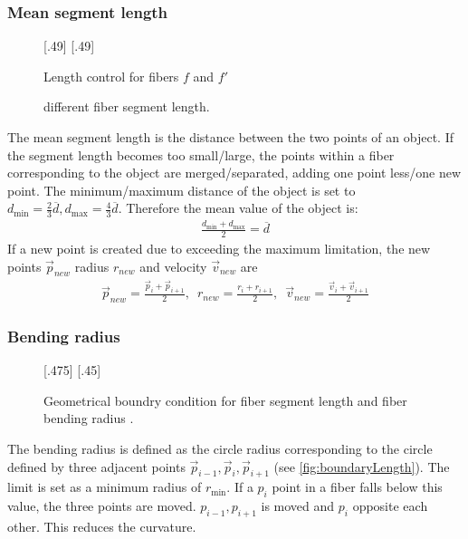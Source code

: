 \subsubsection{Mean segment length}
% 
\begin{figure}[!t]
    \centering
    \setlength{\tikzwidth}{.45\textwidth}
    [.49\textwidth]{
    }
    [.49\textwidth]{
    }
	\caption{Length control for fibers $f$ and $f'$}
	\label{fig:mergeSplit}
\end{figure}
% 
% 
\begin{figure}[!t]
    \centering
    \setlength{\tikzwidth}{0.75\textwidth}
    \tikzset{external/export next=false}
	\caption{different fiber segment length.}
	\label{fig:modelLength}
\end{figure}
% 
The mean segment length is the distance between the two points of an object.
If the segment length becomes too small/large, the points within a fiber corresponding to the object are merged/separated, adding one point less/one new point.
The minimum/maximum distance of the object is set to $d_{\min} = \frac{2}{3} \overline{d}, d_{\max} = \frac{4}{3}\overline{d}$.
Therefore the mean value of the object is:
\begin{align}
\frac{d_{\min} + d_{\max}}{2} = \overline{d}
\end{align}
% 
If a new point is created due to exceeding the maximum limitation, the new points $\vec{p}_{new}$ radius $r_{new}$ and velocity $\vec{v}_{new}$ are 
\begin{align}
\vec{p}_{new} = \frac{\vec{p}_{i} + \vec{p}_{i+1}}{2},\enspace
r_{new} = \frac{r_{i} + r_{i+1}}{2},\enspace
\vec{v}_{new} = \frac{\vec{v}_{i} + \vec{v}_{i+1}}{2}
\end{align}
% 
\subsubsection{Bending radius}
% 
\begin{figure}[!t]
    \centering
    \def\tikzheight{.40\textwidth}
    [.475\textwidth]{
    }\hfill
    [.45\textwidth]{
    }
	\caption{Geometrical boundry condition for fiber segment length \segLength and fiber bending radius \segRadius.}
	\label{fig:modelCircle}
\end{figure}
% 
The bending radius is defined as the circle radius corresponding to the circle defined by three adjacent points $\vec{p}_{i-1}, \vec{p}_{i}, \vec{p}_{i+1}$ (see \cref{fig:boundaryLength}). 
The limit is set as a minimum radius of $r_{\min}$.
If a $p_{i}$ point in a fiber falls below this value, the three points are moved.
$p_{i-1},p_{i+1}$ is moved \dummy{} and $p_{i}$ opposite each other.
This reduces the curvature.
\\
% 
